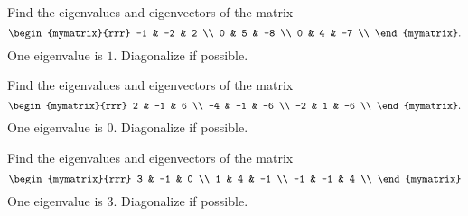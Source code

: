 \begin{enumialphparenastyle}
\begin{ex}
  Find the eigenvalues and eigenvectors of the matrix
  \begin{equation*}
    \begin{mymatrix}{rrr}
      -1 & -2 & 2 \\
      0 & 5 & -8 \\
      0 & 4 & -7 \\
    \end{mymatrix}.
  \end{equation*}
  One eigenvalue is $1$. Diagonalize if possible.
\end{ex}

\begin{ex}
  Find the eigenvalues and eigenvectors of the matrix
  \begin{equation*}
    \begin{mymatrix}{rrr}
      2 &  -1 &   6 \\
      -4 &  -1 &  -6 \\
      -2 &   1 &  -6 \\
    \end{mymatrix}.
  \end{equation*}
  One eigenvalue is $0$. Diagonalize if possible.
\end{ex}

\begin{ex}
  Find the eigenvalues and eigenvectors of the matrix
  \begin{equation*}
    \begin{mymatrix}{rrr}
      3 &  -1 &   0 \\
      1 &   4 &  -1 \\
      -1 & -1 &   4 \\
    \end{mymatrix}
  \end{equation*}
  One eigenvalue is $3$. Diagonalize if possible.
\end{ex}

\end{enumialphparenastyle}
